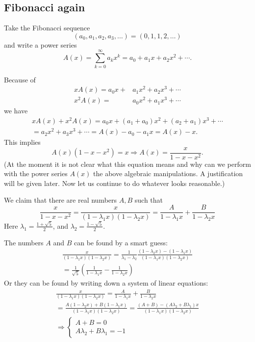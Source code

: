 \subsection{Fibonacci again}
\label{sec:FibAgain}
Take the Fibonacci sequence
\[
(a_0, a_1, a_2, a_3, \ldots) = (0, 1, 1, 2, \ldots)
\]
and write a power series
\[
A(x) = \sum_{k=0}^\infty a_k x^k = a_0 + a_1 x + a_2 x^2 + \cdots.
\]

Because of
\begin{align*}
xA(x)  = a_0x + & a_1x^2 + a_2x^3 + \cdots\\
x^2A(x)  = & a_0x^2 + a_1x^3 + \cdots
\end{align*}
we have
\begin{multline*}
xA(x) + x^2A(x) = a_0 x + (a_1+a_0)x^2 + (a_2+a_1)x^3 + \cdots\\
= a_2x^2 + a_3x^3 + \cdots = A(x) - a_0 - a_1 x = A(x) - x.
\end{multline*}
This implies
\[
A(x)(1-x-x^2) = x \Rightarrow A(x) = \frac{x}{1-x-x^2}.
\]
(At the moment it is not clear what this equation means and why can we perform with the power series $A(x)$ the above algebraic manipulations.
A justification will be given later. Now let us continue to do whatever looks reasonable.)

We claim that there are real numbers $A, B$ such that
\[
\frac{x}{1-x-x^2} = \frac{x}{(1-\lambda_1x)(1-\lambda_2x)} = \frac{A}{1-\lambda_1x} + \frac{B}{1-\lambda_2x}
\]
Here $\lambda_1 = \frac{1+\sqrt{5}}2$, and $\lambda_2 = \frac{1-\sqrt{5}}2$.

The numbers $A$ and $B$ can be found by a smart guess:
\begin{multline*}
\frac{x}{(1-\lambda_1x)(1-\lambda_2x)} =
\frac{1}{\lambda_1 - \lambda_2} \frac{(1-\lambda_2x) - (1-\lambda_1x)}{(1-\lambda_1x)(1-\lambda_2x)}\\
= \frac{1}{\sqrt{5}} \left( \frac{1}{1-\lambda_1x} - \frac{1}{1-\lambda_2x} \right)
\end{multline*}
Or they can be found by writing down a system of linear equations:
\begin{multline*}
\frac{x}{(1-\lambda_1x)(1-\lambda_2x)} = \frac{A}{1-\lambda_1x} + \frac{B}{1-\lambda_2x}\\
= \frac{A(1-\lambda_2x) + B(1-\lambda_1x)}{(1-\lambda_1x)(1-\lambda_2x)}
= \frac{(A+B) - (A\lambda_2 + B\lambda_1)x}{(1-\lambda_1x)(1-\lambda_2x)}\\
\Rightarrow \begin{cases} A+B = 0\\ A\lambda_2 + B\lambda_1 = -1 \end{cases}
\end{multline*}

